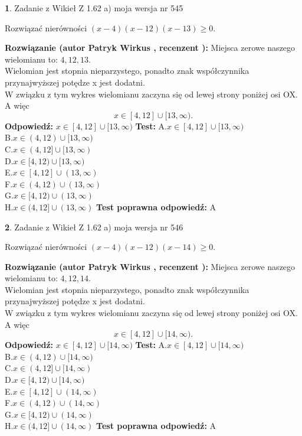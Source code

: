 \documentclass[12pt, a4paper]{article}
\theoremstyle{definition} %
\newtheorem{zad}{}
\newcommand{\zadStart}[1]{\begin{zad}#1\newline}
\newcommand{\zadStop}{\end{zad}}
\newcommand{\rozwStart}[2]{\noindent \textbf{Rozwiązanie (autor #1 , recenzent #2): }\newline}
\newcommand{\rozwStop}{\newline}
\newcommand{\odpStart}{\noindent \textbf{Odpowiedź:}\newline}
\newcommand{\odpStop}{\newline}
\newcommand{\testStart}{\noindent \textbf{Test:}\newline}
\newcommand{\testStop}{\newline}
\newcommand{\kluczStart}{\noindent \textbf{Test poprawna odpowiedź:}\newline}
\newcommand{\kluczStop}{\newline}
\begin{document}
\zadStart{Zadanie z Wikieł Z 1.62 a) moja wersja nr 545}

Rozwiązać nierówności $(x-4)(x-12)(x-13)\ge0$.
\zadStop
\rozwStart{Patryk Wirkus}{}
Miejsca zerowe naszego wielomianu to: $4, 12, 13$.\\
Wielomian jest stopnia nieparzystego, ponadto znak współczynnika przy\linebreak najwyższej potędze x jest dodatni.\\ W związku z tym wykres wielomianu zaczyna się od lewej strony poniżej osi OX. A więc $$x \in [4,12] \cup [13,\infty).$$
\rozwStop
\odpStart
$x \in [4,12] \cup [13,\infty)$
\odpStop
\testStart
A.$x \in [4,12] \cup [13,\infty)$\\
B.$x \in (4,12) \cup [13,\infty)$\\
C.$x \in (4,12] \cup [13,\infty)$\\
D.$x \in [4,12) \cup [13,\infty)$\\
E.$x \in [4,12] \cup (13,\infty)$\\
F.$x \in (4,12) \cup (13,\infty)$\\
G.$x \in [4,12) \cup (13,\infty)$\\
H.$x \in (4,12] \cup (13,\infty)$
\testStop
\kluczStart
A
\kluczStop



\zadStart{Zadanie z Wikieł Z 1.62 a) moja wersja nr 546}

Rozwiązać nierówności $(x-4)(x-12)(x-14)\ge0$.
\zadStop
\rozwStart{Patryk Wirkus}{}
Miejsca zerowe naszego wielomianu to: $4, 12, 14$.\\
Wielomian jest stopnia nieparzystego, ponadto znak współczynnika przy\linebreak najwyższej potędze x jest dodatni.\\ W związku z tym wykres wielomianu zaczyna się od lewej strony poniżej osi OX. A więc $$x \in [4,12] \cup [14,\infty).$$
\rozwStop
\odpStart
$x \in [4,12] \cup [14,\infty)$
\odpStop
\testStart
A.$x \in [4,12] \cup [14,\infty)$\\
B.$x \in (4,12) \cup [14,\infty)$\\
C.$x \in (4,12] \cup [14,\infty)$\\
D.$x \in [4,12) \cup [14,\infty)$\\
E.$x \in [4,12] \cup (14,\infty)$\\
F.$x \in (4,12) \cup (14,\infty)$\\
G.$x \in [4,12) \cup (14,\infty)$\\
H.$x \in (4,12] \cup (14,\infty)$
\testStop
\kluczStart
A
\kluczStop
\end{document}
